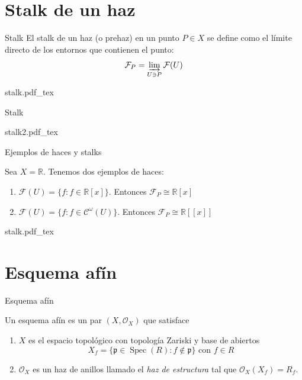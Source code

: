 \documentclass[10pt]{beamer}
\DeclareMathOperator{\Spec}{Spec}
\newcommand{\incfig}[1]{%
\center
\def\svgwidth{0.9\columnwidth}
{#1.pdf_tex}
}
\begin{document}
\section{Stalk de un haz}

\begin{frame}[fragile]{Stalk}
El stalk de un haz (o prehaz) en un punto $P\in X$ se define como el límite directo de los entornos que contienen el punto:
\[
\mathcal{F}_P = \varinjlim_{U \ni P} \mathcal{F}(U) 
\]

\incfig{stalk}

\end{frame}


\begin{frame}[fragile]{Stalk}

\incfig{stalk2}

\end{frame}


\begin{frame}[fragile]{Ejemplos de haces y stalks}

  Sea $X = \mathbb{R}$. Tenemos dos ejemplos de haces:
\begin{enumerate}
  \item $\mathcal{F}(U) = \{f: f\in \mathbb{R}[x]\}$. Entonces $\mathcal{F}_P \cong \mathbb{R}[x]$ 
  \item $\mathcal{F}(U) = \{f: f\in \mathcal{C}^{\omega}(U) \}$. Entonces $\mathcal{F}_P \cong \mathbb{R}[[x]]$ 
\end{enumerate}

\incfig{stalk}

\end{frame}

\section{Esquema afín}

\begin{frame}[fragile]{Esquema afín}
  
Un esquema afín es un par $(X, \mathcal{O}_X)$ que satisface
\begin{enumerate}
    \item $X$ es el espacio topológico con topología Zariski y base de abiertos 
    \[
    X_f = \{\mathfrak{p} \in \Spec (R) : f \not\in \mathfrak{p}  \} \text{ con } f \in R
    \]
    \item $\mathcal{O}_X$ es un haz de anillos llamado el \textit{haz de estructura} tal que $\mathcal{O}_X(X_f) = R_f$.
\end{enumerate}

\end{frame}
\end{document}
